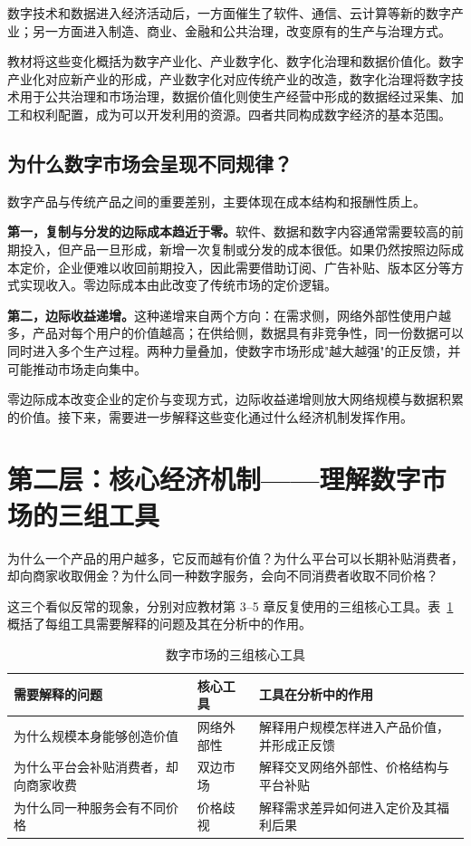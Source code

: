 数字技术和数据进入经济活动后，一方面催生了软件、通信、云计算等新的数字产业；另一方面进入制造、商业、金融和公共治理，改变原有的生产与治理方式。

教材将这些变化概括为数字产业化、产业数字化、数字化治理和数据价值化。数字产业化对应新产业的形成，产业数字化对应传统产业的改造，数字化治理将数字技术用于公共治理和市场治理，数据价值化则使生产经营中形成的数据经过采集、加工和权利配置，成为可以开发利用的资源。四者共同构成数字经济的基本范围。

\subsection{为什么数字市场会呈现不同规律？}

数字产品与传统产品之间的重要差别，主要体现在成本结构和报酬性质上。

\textbf{第一，复制与分发的边际成本趋近于零。}软件、数据和数字内容通常需要较高的前期投入，但产品一旦形成，新增一次复制或分发的成本很低。如果仍然按照边际成本定价，企业便难以收回前期投入，因此需要借助订阅、广告补贴、版本区分等方式实现收入。零边际成本由此改变了传统市场的定价逻辑。

\textbf{第二，边际收益递增。}这种递增来自两个方向：在需求侧，网络外部性使用户越多，产品对每个用户的价值越高；在供给侧，数据具有非竞争性，同一份数据可以同时进入多个生产过程。两种力量叠加，使数字市场形成"越大越强"的正反馈，并可能推动市场走向集中。

零边际成本改变企业的定价与变现方式，边际收益递增则放大网络规模与数据积累的价值。接下来，需要进一步解释这些变化通过什么经济机制发挥作用。

\section[第二层：核心经济机制]{第二层：核心经济机制——理解数字市场的三组工具}

为什么一个产品的用户越多，它反而越有价值？为什么平台可以长期补贴消费者，却向商家收取佣金？为什么同一种数字服务，会向不同消费者收取不同价格？

这三个看似反常的现象，分别对应教材第 3--5 章反复使用的三组核心工具。表~\ref{tab:trial-core-tools} 概括了每组工具需要解释的问题及其在分析中的作用。

\begin{table}[htbp]
\centering
\setlength{\tabcolsep}{4pt}
\renewcommand{\arraystretch}{1.35}
\caption{数字市场的三组核心工具}
\label{tab:trial-core-tools}
\begin{tabular}{p{3.5cm}p{2.2cm}p{6.0cm}}
\hline
\textbf{需要解释的问题} & \textbf{核心工具} & \textbf{工具在分析中的作用} \\
\hline
为什么规模本身能够创造价值 & 网络外部性 & 解释用户规模怎样进入产品价值，并形成正反馈 \\
为什么平台会补贴消费者，却向商家收费 & 双边市场 & 解释交叉网络外部性、价格结构与平台补贴 \\
为什么同一种服务会有不同价格 & 价格歧视 & 解释需求差异如何进入定价及其福利后果 \\
\hline
\end{tabular}
\end{table}


